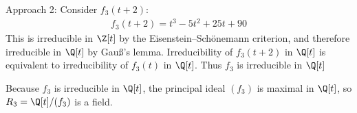 {Approach 2: Consider $f_{3}(t + 2)$:
\begin{align*}
f_{3}(t + 2)
=
t^{3} - 5 t^{2} + 25 t + 90
\end{align*}
This is irreducible in $\Z[t]$ by the Eisenstein--Sch\"{o}nemann criterion, and therefore irreducible in $\Q[t]$ by Gau\ss{}'s lemma. Irreducibility of $f_{3}(t + 2)$ in $\Q[t]$ is equivalent to irreducibility of $f_{3}(t)$ in $\Q[t]$. Thus $f_{3}$ is irreducible in $\Q[t]$

Because $f_{3}$ is irreducible in $\Q[t]$, the principal ideal $(f_{3})$ is maximal in $\Q[t]$, so $R_{3} = \Q[t] / (f_{3})$ is a field.}%